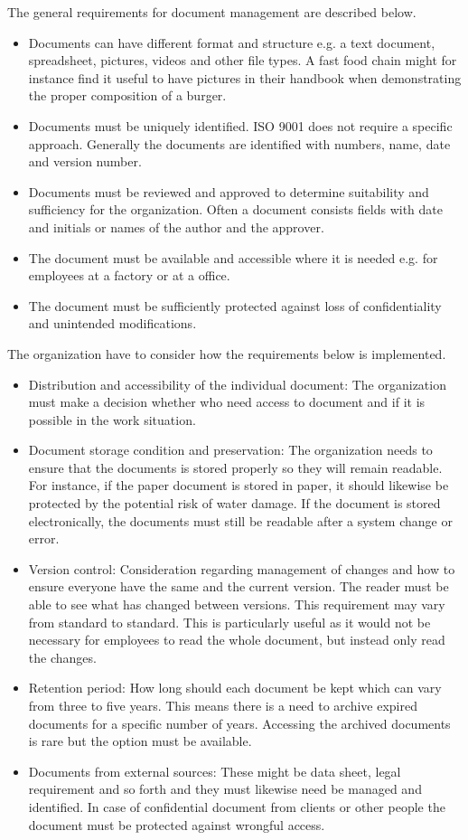 The general requirements for document management are described below.

\begin{itemize}
	\item Documents can have different format and structure e.g. a text document, spreadsheet, pictures, videos and other file types. A fast food chain might for instance find it useful to have pictures in their handbook when demonstrating the proper composition of a burger.
	\item Documents must be uniquely identified. ISO 9001 does not require a specific approach. Generally the documents are identified with numbers, name, date and version number.
	\item Documents must be reviewed and approved to determine suitability and sufficiency for the organization. Often a document consists fields with date and initials or names of the author and  the approver.
	\item The document must be available and accessible where it is needed e.g. for employees at a factory or at a office.
	\item The document must be sufficiently protected against loss of confidentiality and unintended modifications.
\end{itemize}

The organization have to consider how  the requirements below is implemented.

\begin{itemize}
	\item Distribution and accessibility of the individual document: The organization must make a decision whether who need access to document and if it is possible in the work situation.
	\item Document storage condition and preservation: The organization needs to ensure that the documents is stored properly so they will remain readable. For instance, if the paper document is stored in paper, it should likewise be protected by the potential risk of water damage. If the document is stored electronically, the documents must still be readable after a system change or error.
	\item Version control: Consideration regarding management of changes and how to ensure everyone have the same and the current version. The reader must be able to see what has changed between versions. This requirement may vary from standard to standard. This is particularly useful as it would not be necessary for employees to read the whole document, but instead only read the changes.
	\item Retention period: How long should each document be kept which can vary from three to five years. This means there is a need to archive expired documents for a specific number of years. Accessing the archived documents is rare but the option must be available.
	\item Documents from external sources: These might be data sheet, legal requirement and so forth and they must likewise need be managed and identified. In case of confidential document from clients or other people the document must be protected against wrongful access.
\end{itemize}

